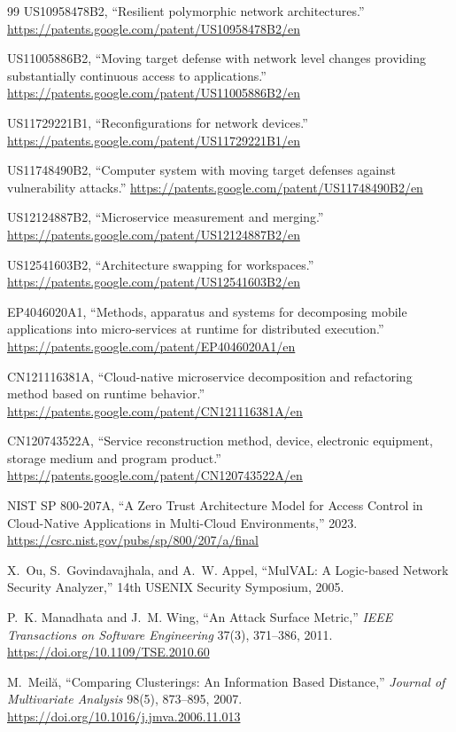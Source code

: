 \documentclass[11pt,letterpaper]{article}
\begin{document}
\begin{thebibliography}{99}
 US10958478B2, ``Resilient polymorphic network architectures.'' \url{https://patents.google.com/patent/US10958478B2/en}

 US11005886B2, ``Moving target defense with network level changes providing substantially continuous access to applications.'' \url{https://patents.google.com/patent/US11005886B2/en}

 US11729221B1, ``Reconfigurations for network devices.'' \url{https://patents.google.com/patent/US11729221B1/en}

 US11748490B2, ``Computer system with moving target defenses against vulnerability attacks.'' \url{https://patents.google.com/patent/US11748490B2/en}

 US12124887B2, ``Microservice measurement and merging.'' \url{https://patents.google.com/patent/US12124887B2/en}

 US12541603B2, ``Architecture swapping for workspaces.'' \url{https://patents.google.com/patent/US12541603B2/en}

 EP4046020A1, ``Methods, apparatus and systems for decomposing mobile applications into micro-services at runtime for distributed execution.'' \url{https://patents.google.com/patent/EP4046020A1/en}

 CN121116381A, ``Cloud-native microservice decomposition and refactoring method based on runtime behavior.'' \url{https://patents.google.com/patent/CN121116381A/en}

 CN120743522A, ``Service reconstruction method, device, electronic equipment, storage medium and program product.'' \url{https://patents.google.com/patent/CN120743522A/en}

 NIST SP 800-207A, ``A Zero Trust Architecture Model for Access Control in Cloud-Native Applications in Multi-Cloud Environments,'' 2023. \url{https://csrc.nist.gov/pubs/sp/800/207/a/final}

 X.~Ou, S.~Govindavajhala, and A.~W. Appel, ``MulVAL: A Logic-based Network Security Analyzer,'' 14th USENIX Security Symposium, 2005.

 P.~K. Manadhata and J.~M. Wing, ``An Attack Surface Metric,'' \emph{IEEE Transactions on Software Engineering} 37(3), 371--386, 2011. \url{https://doi.org/10.1109/TSE.2010.60}

 M.~Meil\u{a}, ``Comparing Clusterings: An Information Based Distance,'' \emph{Journal of Multivariate Analysis} 98(5), 873--895, 2007. \url{https://doi.org/10.1016/j.jmva.2006.11.013}


\end{thebibliography}
\end{document}
